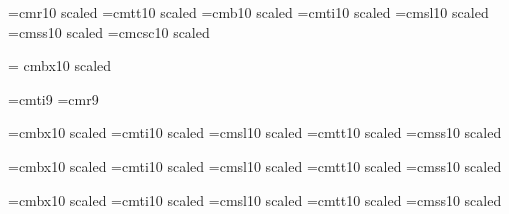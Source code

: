 \begin{\parsearg\beginxxx}
\let\refill=\relax

\let\setfilename=\comment

\def\inforef #1{\inforefzzz #1,,,,**}
\def\inforefzzz #1,#2,#3,#4**{See Info file \file{\losespace#3{}}, node `\losespace#1{}'}
\def\losespace #1{#1}



\font\tenrm=cmr10 scaled \magstephalf
\font\tentt=cmtt10 scaled \magstephalf
\font\tenbf=cmb10 scaled \magstephalf
\font\tenit=cmti10 scaled \magstephalf
\font\tensl=cmsl10 scaled \magstephalf
\font\tensf=cmss10 scaled \magstephalf
\def\li{\sf}
\font\tensc=cmcsc10 scaled \magstephalf

\font\titlerm = cmbx10 scaled 

\font\indit=cmti9 \font\indrm=cmr9
\def\indbf{\indrm} \def\indsl{\indit}
\def\indexfonts{\let\it=\indit \let\sl=\indsl \let\bf=\indbf \let\rm=\indrm}

\font\chaprm=cmbx10 scaled 
\font\chapit=cmti10 scaled 
\font\chapsl=cmsl10 scaled 
\font\chaptt=cmtt10 scaled 
\font\chapsf=cmss10 scaled 
\let\chapbf=\chaprm

\font\secrm=cmbx10 scaled 
\font\secit=cmti10 scaled 
\font\secsl=cmsl10 scaled 
\font\sectt=cmtt10 scaled 
\font\secsf=cmss10 scaled 
\let\secbf=\secrm

\font\ssecrm=cmbx10 scaled 
\font\ssecit=cmti10 scaled 
\font\ssecsl=cmsl10 scaled 
\font\ssectt=cmtt10 scaled 
\font\ssecsf=cmss10 scaled 
\let\ssecbf=\ssecrm

\def\textfonts{\let\rm=\tenrm\let\it=\tenit\let\sl=\tensl\let\bf=\tenbf%
\let\sc=\tensc\let\sf=\tensf}
\def\chapfonts{\let\rm=\chaprm\let\it=\chapit\let\sl=\chapsl\let\bf=\chapbf\let\tt=\chaptt\let\sf=\chapsf}
\def\secfonts{\let\rm=\secrm\let\it=\secit\let\sl=\secsl\let\bf=\secbf\let\tt=\sectt\let\sf=\secsf}
\def\subsecfonts{\let\rm=\ssecrm\let\it=\ssecit\let\sl=\ssecsl\let\bf=\ssecbf\let\tt=\ssectt\let\sf=\ssecsf}
\newcount\fontdepth {}


\def\i#1{{\sl #1}}
\let\var=\i
\let\dfn=\i
\let\emph=\i
\let\cite=\i


\end{\parsearg\beginxxx}
